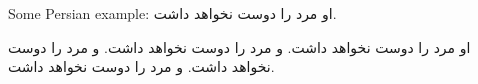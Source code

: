 \documentclass{scrbook}
\newcommand{\RL}[1]{\beginR #1\endR}
\newcommand{\PRL}[1]{\RL{\Parsifont #1}}
\begin{document}
    Some Persian example: \PRL{او مرد را دوست نخواهد داشت.}


    \PRL{او مرد را دوست نخواهد داشت. و مرد را دوست نخواهد داشت. و مرد را دوست نخواهد داشت. و مرد را دوست نخواهد داشت.}


    
\end{document}
